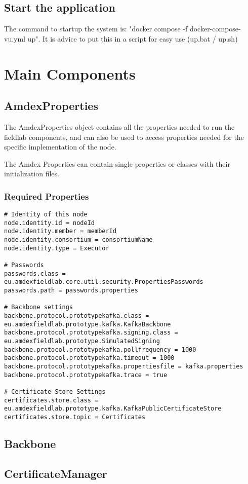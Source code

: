 \documentclass{article}
\begin{document}
\subsection{Start the application}
The command to startup the system is: "docker compose -f docker-compose-vu.yml up". It is advice to put this in a script for easy use (up.bat / up.sh)

\section{Main Components}
\subsection{AmdexProperties}
The AmdexProperties object contains all the properties needed to run the fieldlab components, and can also be used to access properties needed for the specific implementation of the node.

The Amdex Properties can contain single properties or classes with their initialization files.
\subsubsection{Required Properties}
\begin{verbatim}
# Identity of this node
node.identity.id = nodeId
node.identity.member = memberId
node.identity.consortium = consortiumName
node.identity.type = Executor

# Passwords
passwords.class = eu.amdexfieldlab.core.util.security.PropertiesPasswords
passwords.path = passwords.properties

# Backbone settings
backbone.protocol.prototypekafka.class = eu.amdexfieldlab.prototype.kafka.KafkaBackbone
backbone.protocol.prototypekafka.signing.class = eu.amdexfieldlab.prototype.SimulatedSigning
backbone.protocol.prototypekafka.pollfrequency = 1000
backbone.protocol.prototypekafka.timeout = 1000
backbone.protocol.prototypekafka.propertiesfile = kafka.properties
backbone.protocol.prototypekafka.trace = true

# Certificate Store Settings
certificates.store.class = eu.amdexfieldlab.prototype.kafka.KafkaPublicCertificateStore
certificates.store.topic = Certificates

\end{verbatim}
\subsection{Backbone}
\subsection{CertificateManager}
\end{document}
